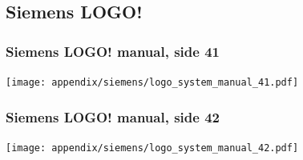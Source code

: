 \newpage
\subsection{Siemens LOGO!}

\subsubsection{Siemens LOGO! manual, side 41}
\label{man:logo_side_41}
\texttt{[image: appendix/siemens/logo\_system\_manual\_41.pdf]}

\subsubsection{Siemens LOGO! manual, side 42}
\label{man:logo_side_42}
\texttt{[image: appendix/siemens/logo\_system\_manual\_42.pdf]}

